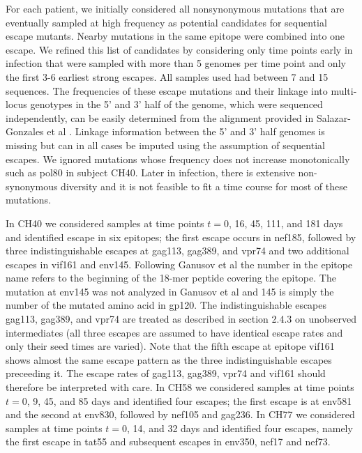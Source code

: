 \documentclass{frontiers}
\begin{document}
For each patient, we initially considered all nonsynonymous mutations that are eventually
sampled at high frequency as potential candidates for sequential escape mutants. 
Nearby mutations in the same epitope were combined into one escape. We refined
this list of candidates by considering only time points early in infection that were sampled with
more than 5 genomes per time point and only the first 3-6 earliest
strong escapes. All samples used had between 7 and 15 sequences.
The frequencies of these escape mutations and their linkage into
multi-locus genotypes in the 5' and 3' half of the genome, which were
sequenced independently, can be easily
determined from the alignment provided in
Salazar-Gonzales et al \cite{SalazarGonzalez:2009p35091}. Linkage information between
the 5' and 3' half genomes is missing but can in all cases be imputed
using the assumption of sequential escapes.  We ignored mutations whose frequency
does not increase monotonically such as pol80 in subject CH40.
Later in infection, there is extensive non-synonymous diversity and it is not 
feasible to fit a time course for most of these mutations.

In CH40 we considered samples at time points $t = 0$, 16, 45, 111, and 181 days and 
identified escape in six epitopes; the first escape occurs in nef185,
followed by three indistinguishable escapes at gag113, gag389, and vpr74
and two additional escapes in vif161 and env145. Following 
Ganusov et al \cite{ganusov_fitness_2011} the number in the epitope name refers
to the beginning of the 18-mer peptide covering the epitope. The mutation
at env145 was not analyzed in Ganusov et al \cite{ganusov_fitness_2011} and 145
is simply the number of the mutated amino acid in gp120.
The indistinguishable escapes gag113, gag389, and vpr74 are treated as
described in section 2.4.3 on unobserved intermediates (all three escapes are
assumed to have identical escape rates and only their seed times are
varied). Note that the fifth escape at epitope vif161 shows almost the
same escape pattern as the three indistinguishable escapes preceeding
it. The escape rates of gag113, gag389, vpr74 and vif161 should
therefore be interpreted with care.
In CH58 we considered samples at time points $t = 0$, 9, 45, and 85 days and identified
four escapes; the first escape is at env581 and the second at env830,
followed by nef105 and gag236. 
In CH77 we considered samples at time points 
$t = 0$, 14, and 32 days and identified four escapes, namely the first escape
in tat55 and subsequent escapes in env350, nef17 and nef73.
\end{document}
